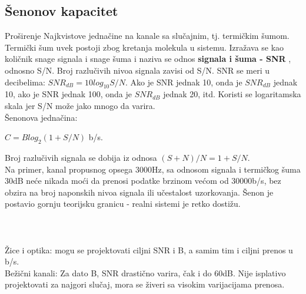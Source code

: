 \documentclass{article} %
\begin{document}
\subsection{Šenonov kapacitet}

Proširenje Najkvistove jednačine na kanale sa slučajnim, tj. termičkim šumom. Termički šum uvek postoji zbog kretanja molekula u sistemu. Izražava se kao količnik snage signala i snage šuma i naziva se  odnos \textbf{signala i šuma - SNR }, odnosno S/N. Broj razlučivih nivoa signala zavisi od S/N. SNR se meri u decibelima: $ SNR_{dB} = 10 log_{10} S/N $. Ako je SNR jednak 10, onda je $SNR_{dB} $ jednak 10, ako je SNR jednak 100, onda je $ SNR_{dB} $ jednak 20, itd. Koristi se logaritamska skala jer S/N može jako mnogo da varira.\\
Šenonova jednačina:
\begin{center}
 $ C=B log_{2} (1+S/N)$  b/s.
\end{center}
Broj razlučivih signala se dobija iz odnosa $ (S+N)/N = 1+S/N $.
\\
Na primer, kanal propusnog opsega 3000Hz, sa odnosom signala i termičkog šuma 30dB neće nikada moći da prenosi podatke brzinom većom od 30000b/s, bez obzira na broj naponskih nivoa signala ili učestalost uzorkovanja. Šenon je postavio gornju teorijsku granicu - realni sistemi je retko dostižu.
\\\\\\\\
Žice i optika: mogu se projektovati ciljni SNR i B, a samim tim i ciljni prenos u b/s.\\
Bežični kanali: Za dato B, SNR drastično varira, čak i do 60dB. Nije isplativo projektovati za najgori slučaj, mora se živeri sa visokim varijacijama prenosa.
\end{document}
